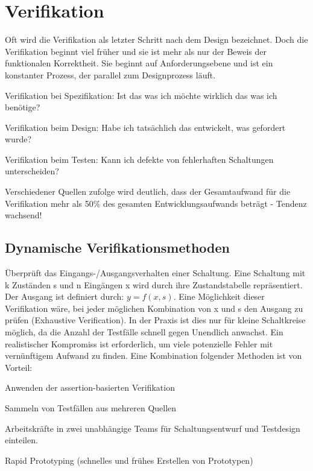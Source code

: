 \section{Verifikation}$~$ \\
Oft wird die Verifikation als letzter Schritt nach dem Design bezeichnet. Doch die Verifikation beginnt viel früher und sie ist mehr als nur der Beweis der funktionalen Korrektheit. Sie beginnt auf Anforderungsebene und ist ein konstanter Prozess, der parallel zum Designprozess läuft.
\begin{compactitem}
    \item Verifikation bei Spezifikation: Ist das was ich möchte wirklich das was ich benötige?
    \item Verifikation beim Design: Habe ich tatsächlich das entwickelt, was gefordert wurde?
    \item Verifikation beim Testen: Kann ich defekte von fehlerhaften Schaltungen unterscheiden?
\end{compactitem}
Verschiedener Quellen zufolge wird deutlich, dass der Gesamtaufwand für die Verifikation mehr als 50\% des gesamten Entwicklungsaufwands beträgt - Tendenz wachsend!

\subsection{Dynamische Verifikationsmethoden}$~$ \\
Überprüft das Eingangs-/Ausgangsverhalten einer Schaltung. Eine Schaltung mit k Zuständen s und n Eingängen x wird durch ihre Zustandstabelle repräsentiert. Der Ausgang ist definiert durch: $y=f(x,s)$. Eine Möglichkeit dieser Verifikation wäre, bei jeder möglichen Kombination von x und s den Ausgang zu prüfen (Exhaustive Verification). In der Praxis ist dies nur für kleine Schaltkreise möglich, da die Anzahl der Testfälle schnell gegen Unendlich anwachst. Ein realistischer Kompromiss ist erforderlich, um viele potenzielle Fehler mit vernünftigem Aufwand zu finden. Eine Kombination folgender Methoden ist von Vorteil:
\begin{compactitem}
    \item Anwenden der assertion-basierten Verifikation
    \item Sammeln von Testfällen aus mehreren Quellen
    \item Arbeitskräfte in zwei unabhängige Teams für Schaltungsentwurf und Testdesign einteilen.
    \item Rapid Prototyping (schnelles und frühes Erstellen von Prototypen)
\end{compactitem}

